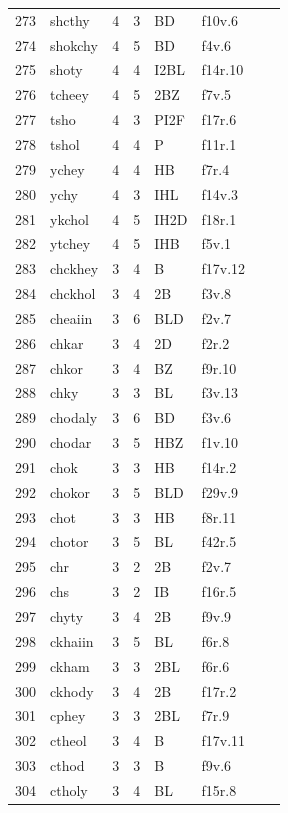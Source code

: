 \documentclass[11pt,a4paper]{article}
\begin{document}
\begin{landscape}
\begin{longtable}{@{}r>{\ttfamily}lrrl>{\ttfamily}l>{\raggedright\arraybackslash}p{80mm}>{\raggedright\arraybackslash}p{36mm}@{}}
273 & shcthy & 4 & 3 & BD & f10v.6 &  & \\
274 & shokchy & 4 & 5 & BD & f4v.6 &  & \\
275 & shoty & 4 & 4 & I2BL & f14r.10 &  & \\
276 & tcheey & 4 & 5 & 2BZ & f7v.5 &  & \\
277 & tsho & 4 & 3 & PI2F & f17r.6 &  & \\
278 & tshol & 4 & 4 & P & f11r.1 &  & \\
279 & ychey & 4 & 4 & HB & f7r.4 &  & \\
280 & ychy & 4 & 3 & IHL & f14v.3 &  & \\
281 & ykchol & 4 & 5 & IH2D & f18r.1 &  & \\
282 & ytchey & 4 & 5 & IHB & f5v.1 &  & \\
283 & chckhey & 3 & 4 & B & f17v.12 &  & \\
284 & chckhol & 3 & 4 & 2B & f3v.8 &  & \\
285 & cheaiin & 3 & 6 & BLD & f2v.7 &  & \\
286 & chkar & 3 & 4 & 2D & f2r.2 &  & \\
287 & chkor & 3 & 4 & BZ & f9r.10 &  & \\
288 & chky & 3 & 3 & BL & f3v.13 &  & \\
289 & chodaly & 3 & 6 & BD & f3v.6 &  & \\
290 & chodar & 3 & 5 & HBZ & f1v.10 &  & \\
291 & chok & 3 & 3 & HB & f14r.2 &  & \\
292 & chokor & 3 & 5 & BLD & f29v.9 &  & \\
293 & chot & 3 & 3 & HB & f8r.11 &  & \\
294 & chotor & 3 & 5 & BL & f42r.5 &  & \\
295 & chr & 3 & 2 & 2B & f2v.7 &  & \\
296 & chs & 3 & 2 & IB & f16r.5 &  & \\
297 & chyty & 3 & 4 & 2B & f9v.9 &  & \\
298 & ckhaiin & 3 & 5 & BL & f6r.8 &  & \\
299 & ckham & 3 & 3 & 2BL & f6r.6 &  & \\
300 & ckhody & 3 & 4 & 2B & f17r.2 &  & \\
301 & cphey & 3 & 3 & 2BL & f7r.9 &  & \\
302 & ctheol & 3 & 4 & B & f17v.11 &  & \\
303 & cthod & 3 & 3 & B & f9v.6 &  & \\
304 & ctholy & 3 & 4 & BL & f15r.8 &  & \\

\end{longtable}
\end{landscape}
\end{document}
